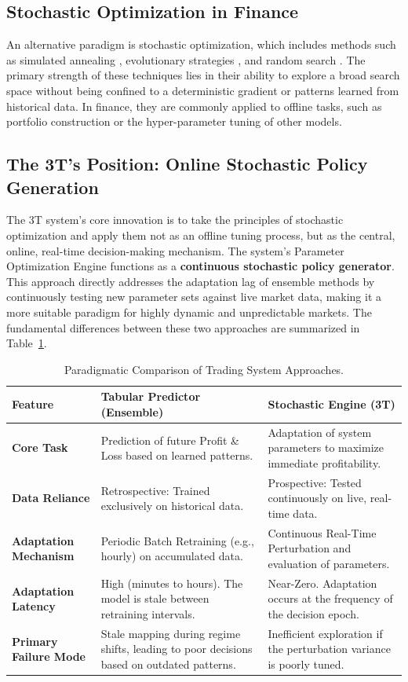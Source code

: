 \documentclass[10pt]{article}
\begin{document}
\subsection{Stochastic Optimization in Finance}
An alternative paradigm is stochastic optimization, which includes methods such as simulated annealing \cite{ref:annealing}, evolutionary strategies \cite{ref:evolution}, and random search \cite{ref:random_search}. The primary strength of these techniques lies in their ability to explore a broad search space without being confined to a deterministic gradient or patterns learned from historical data. In finance, they are commonly applied to offline tasks, such as portfolio construction or the hyper-parameter tuning of other models.

\subsection{The 3T's Position: Online Stochastic Policy Generation}
The 3T system's core innovation is to take the principles of stochastic optimization and apply them not as an offline tuning process, but as the central, online, real-time decision-making mechanism. The system's Parameter Optimization Engine functions as a \textbf{continuous stochastic policy generator}. This approach directly addresses the adaptation lag of ensemble methods by continuously testing new parameter sets against live market data, making it a more suitable paradigm for highly dynamic and unpredictable markets. The fundamental differences between these two approaches are summarized in Table~\ref{tab:paradigms}.

\begin{table}[t]
\small
\centering
\caption{Paradigmatic Comparison of Trading System Approaches.}
\label{tab:paradigms}
\begin{tabularx}{\textwidth}{@{} l >{\raggedright\arraybackslash}X >{\raggedright\arraybackslash}X @{}}
\toprule
\textbf{Feature} & \textbf{Tabular Predictor (Ensemble)} & \textbf{Stochastic Engine (3T)} \\
\midrule
\textbf{Core Task} & Prediction of future Profit \& Loss based on learned patterns. & Adaptation of system parameters to maximize immediate profitability. \\
\textbf{Data Reliance} & Retrospective: Trained exclusively on historical data. & Prospective: Tested continuously on live, real-time data. \\
\textbf{Adaptation Mechanism} & Periodic Batch Retraining (e.g., hourly) on accumulated data. & Continuous Real-Time Perturbation and evaluation of parameters. \\
\textbf{Adaptation Latency} & High (minutes to hours). The model is stale between retraining intervals. & Near-Zero. Adaptation occurs at the frequency of the decision epoch. \\
\textbf{Primary Failure Mode} & Stale mapping during regime shifts, leading to poor decisions based on outdated patterns. & Inefficient exploration if the perturbation variance is poorly tuned. \\
\bottomrule
\end{tabularx}
\end{table}
\end{document}
